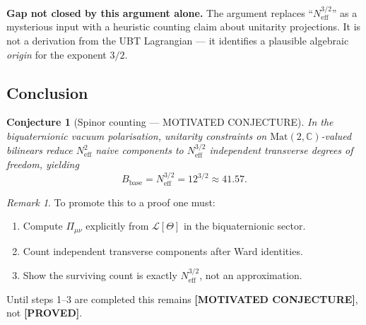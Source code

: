 \documentclass[11pt,a4paper]{article}
\newtheorem{conjecture}{Conjecture}
\theoremstyle{remark}
\newtheorem{remark}{Remark}
\begin{document}
\textbf{Gap not closed by this argument alone.}
The argument replaces ``$N_{\mathrm{eff}}^{3/2}$'' as a mysterious input with a
heuristic counting claim about unitarity projections. It is not a derivation
from the UBT Lagrangian — it identifies a plausible algebraic \emph{origin}
for the exponent $3/2$.

\subsection{Conclusion}

\begin{conjecture}[Spinor counting — MOTIVATED CONJECTURE]
  In the biquaternionic vacuum polarisation, unitarity constraints on
  $\mathrm{Mat}(2,\mathbb{C})$-valued bilinears reduce $N_{\mathrm{eff}}^2$
  naive components to $N_{\mathrm{eff}}^{3/2}$ independent transverse degrees
  of freedom, yielding
  \begin{equation}
    B_{\mathrm{base}} = N_{\mathrm{eff}}^{3/2} = 12^{3/2} \approx 41.57.
    \label{eq:B_conjecture_spinor}
  \end{equation}
\end{conjecture}

\begin{remark}
  To promote this to a proof one must:
  \begin{enumerate}
    \item Compute $\Pi_{\mu\nu}$ explicitly from $\mathcal{L}[\Theta]$ in
      the biquaternionic sector.
    \item Count independent transverse components after Ward identities.
    \item Show the surviving count is exactly $N_{\mathrm{eff}}^{3/2}$, not
      an approximation.
  \end{enumerate}
  Until steps 1--3 are completed this remains \textbf{[MOTIVATED CONJECTURE]},
  not \textbf{[PROVED]}.
\end{remark}

\ifdefined\INCLUDEMODE\else
\end{document}
